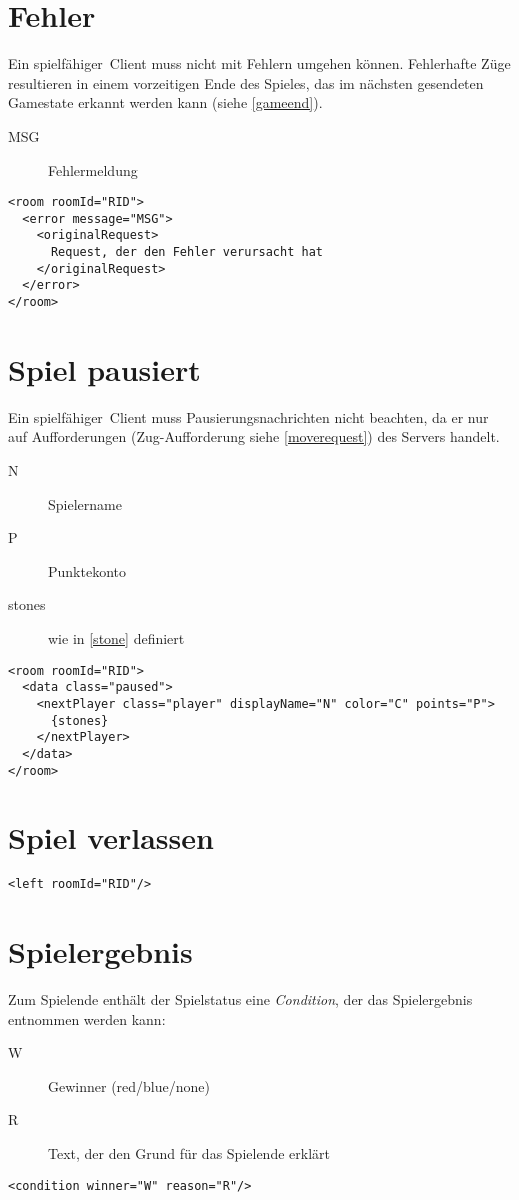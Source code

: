 \documentclass[12pt,a4paper, ngerman, oneside]{scrartcl}
\begin{document}
\section{Fehler}
Ein \glqq spielfähiger\grqq\ Client muss nicht mit Fehlern umgehen können.
Fehlerhafte Züge resultieren in einem vorzeitigen Ende des
Spieles, das im nächsten gesendeten Gamestate erkannt werden kann (siehe \ref{gameend}).
\begin{description}
\item[MSG] Fehlermeldung
\end{description}
\begin{verbatim}
<room roomId="RID">
  <error message="MSG">
    <originalRequest>
      Request, der den Fehler verursacht hat
    </originalRequest>
  </error>
</room>
\end{verbatim}

\section{Spiel pausiert}
Ein \glqq spielfähiger\grqq\ Client muss Pausierungsnachrichten nicht beachten,
da er nur auf Aufforderungen (Zug-Aufforderung siehe \ref{moverequest}) des Servers handelt.
\begin{description}
\item[N] Spielername
\item[P] Punktekonto
\item[stones] wie in \ref{stone} definiert
\end{description}
\begin{verbatim}
<room roomId="RID">
  <data class="paused">
    <nextPlayer class="player" displayName="N" color="C" points="P">
      {stones}
    </nextPlayer>
  </data>
</room>
\end{verbatim}

\section{Spiel verlassen}
\begin{verbatim}
<left roomId="RID"/>
\end{verbatim}


\section{\label{gameend}Spielergebnis}
Zum Spielende enthält der Spielstatus eine \textit{Condition}, der das Spielergebnis entnommen werden kann:
\begin{description}
\item[W] Gewinner (red/blue/none)
\item[R] Text, der den Grund für das Spielende erklärt
\end{description}
\begin{verbatim}
<condition winner="W" reason="R"/>
\end{verbatim}
\end{document}
